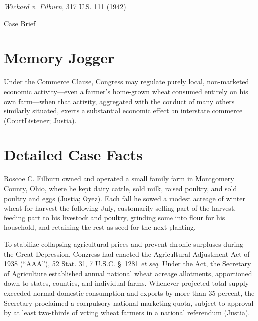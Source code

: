 \documentclass[12pt]{article}
\begin{document}
\begin{center}
{\LARGE \textit{Wickard v. Filburn}, 317 U.S. 111 (1942)\par}
\vspace{0.8em}
{\large Case Brief\par}
\end{center}
\vspace{1em}

\section{Memory Jogger}

Under the Commerce Clause, Congress may regulate purely local, non-marketed economic activity---even a farmer's home-grown wheat consumed entirely on his own farm---when that activity, aggregated with the conduct of many others similarly situated, exerts a substantial economic effect on interstate commerce (\href{https://www.courtlistener.com/opinion/103716/wickard-v-filburn/}{CourtListener}; \href{https://supreme.justia.com/cases/federal/us/317/111/}{Justia}).

\section{Detailed Case Facts}

Roscoe C. Filburn owned and operated a small family farm in Montgomery County, Ohio, where he kept dairy cattle, sold milk, raised poultry, and sold poultry and eggs (\href{https://supreme.justia.com/cases/federal/us/317/111/}{Justia}; \href{https://www.oyez.org/cases/1940-1955/317us111}{Oyez}). Each fall he sowed a modest acreage of winter wheat for harvest the following July, customarily selling part of the harvest, feeding part to his livestock and poultry, grinding some into flour for his household, and retaining the rest as seed for the next planting.

To stabilize collapsing agricultural prices and prevent chronic surpluses during the Great Depression, Congress had enacted the Agricultural Adjustment Act of 1938 (``AAA''), 52 Stat. 31, 7 U.S.C. \S~1281 \textit{et seq.} Under the Act, the Secretary of Agriculture established annual national wheat acreage allotments, apportioned down to states, counties, and individual farms. Whenever projected total supply exceeded normal domestic consumption and exports by more than 35 percent, the Secretary proclaimed a compulsory national marketing quota, subject to approval by at least two-thirds of voting wheat farmers in a national referendum (\href{https://supreme.justia.com/cases/federal/us/317/111/}{Justia}).
\end{document}
